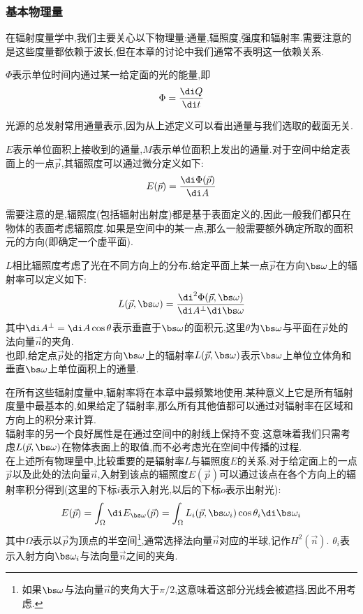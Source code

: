\documentclass{ctexart}
\begin{document}
\subsubsection{基本物理量}
在辐射度量学中,我们主要关心以下物理量:通量,辐照度,强度和辐射率.需要注意的是这些度量都依赖于波长,但在本章的讨论中我们通常不表明这一依赖关系.
\begin{definition}[通量]
    $\Phi$表示单位时间内通过某一给定面的光的能量,即
    \[\Phi=\dfrac{\di Q}{\di t}\]
\end{definition}
光源的总发射常用通量表示,因为从上述定义可以看出通量与我们选取的截面无关.
\begin{definition}[辐照度与辐射出射度]
    $E$表示单位面积上接收到的通量,$M$表示单位面积上发出的通量.对于空间中给定表面上的一点$\vec{p}$,其辐照度可以通过微分定义如下:
    \[E(\vec{p})=\dfrac{\di \Phi(\vec{p})}{\di A}\]
\end{definition}
需要注意的是,辐照度(包括辐射出射度)都是基于表面定义的,因此一般我们都只在物体的表面考虑辐照度.如果是空间中的某一点,那么一般需要额外确定所取的面积元的方向(即确定一个虚平面).
\begin{definition}[辐射率]
    $L$相比辐照度考虑了光在不同方向上的分布.给定平面上某一点$\vec{p}$在方向$\bs\omega$上的辐射率可以定义如下:
    \[L(\vec{p},\bs\omega)=\dfrac{\di^2\Phi(\vec{p},\bs\omega)}{\di A^\bot\di\bs\omega}\]
    其中$\di A^\bot=\di A\cos\theta$表示垂直于$\bs\omega$的面积元,这里$\theta$为$\bs\omega$与平面在$\vec{p}$处的法向量$\vec{n}$的夹角.\\
    也即,给定点$\vec{p}$处的指定方向$\bs\omega$上的辐射率$L(\vec{p},\bs\omega)$表示$\bs\omega$上单位立体角和垂直$\bs\omega$上单位面积上的通量.
\end{definition}
在所有这些辐射度量中,辐射率将在本章中最频繁地使用.某种意义上它是所有辐射度量中最基本的,如果给定了辐射率,那么所有其他值都可以通过对辐射率在区域和方向上的积分来计算.\\
\indent 辐射率的另一个良好属性是在通过空间中的射线上保持不变.这意味着我们只需考虑$L(\vec{p},\bs\omega)$在物体表面上的取值,而不必考虑光在空间中传播的过程.\\
\indent 在上述所有物理量中,比较重要的是辐射率$L$与辐照度$E$的关系.对于给定面上的一点$\vec{p}$以及此处的法向量$\vec{n}$,入射到该点的辐照度$E(\vec{p})$可以通过该点在各个方向上的辐射率积分得到(这里的下标$i$表示入射光,以后的下标$o$表示出射光):
\[E(\vec{p})=\int_{\Omega}\di E_{\bs\omega}(\vec{p})=\int_{\Omega}L_i(\vec{p},\bs\omega_i)\cos\theta_i\di\bs\omega_i\]
其中$\Omega$表示以$\vec{p}$为顶点的半空间\footnote{如果$\bs\omega$与法向量$\vec{n}$的夹角大于$\pi/2$,这意味着这部分光线会被遮挡,因此不用考虑.},通常选择法向量$\vec{n}$对应的半球,记作$H^2(\vec{n})$. $\theta_i$表示入射方向$\bs\omega_i$与法向量$\vec{n}$之间的夹角.
\end{document}
